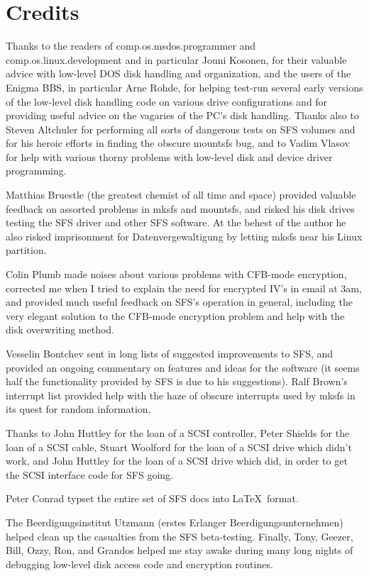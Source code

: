 \section{Credits}

Thanks to the readers of comp.os.msdos.programmer and comp.os.linux.develop\-ment
and in particular Jouni Kosonen, for their valuable advice with low-level DOS
disk handling and organization, and the users of the Enigma BBS, in particular
Arne Rohde, for helping test-run several early versions of the low-level disk
handling code on various drive configurations and for providing useful advice
on the vagaries of the PC's disk handling.   Thanks also to Steven Altchuler
for performing all sorts of dangerous tests on SFS volumes and for his heroic
efforts in finding the obscure mountsfs bug, and to Vadim Vlasov for help with 
various thorny problems with low-level disk and device driver programming.

Matthias Bruestle (the greatest chemist of all time and space) provided
valuable feedback on assorted problems in mksfs and mountsfs, and risked his
disk drives testing the SFS driver and other SFS software.  At the behest of
the author he also risked imprisonment for Datenvergewaltigung by letting mksfs
near his Linux partition.

Colin Plumb made noises about various problems with CFB-mode encryption,
corrected me when I tried to explain the need for encrypted IV's in email at
3am, and provided much useful feedback on SFS's operation in general, including
the very elegant solution to the CFB-mode encryption problem and help with the
disk overwriting method.

Vesselin Bontchev sent in long lists of suggested improvements to SFS, and
provided an ongoing commentary on features and ideas for the software (it seems
half the functionality provided by SFS is due to his suggestions).  Ralf
Brown's interrupt list provided help with the haze of obscure interrupts used
by mksfs in its quest for random information.

Thanks to John Huttley for the loan of a SCSI controller, Peter Shields for the
loan of a SCSI cable, Stuart Woolford for the loan of a SCSI drive which didn't
work, and John Huttley for the loan of a SCSI drive which did, in order to get
the SCSI interface code for SFS going.

Peter Conrad typset the entire set of SFS docs into \LaTeX\ format.

The Beerdigungsinstitut Utzmann (erstes Erlanger Beerdigungsunternehmen) help\-ed
clean up the casualties from the SFS beta-testing.  Finally, Tony, Geezer,
Bill, Ozzy, Ron, and Grandos helped me stay awake during many long nights of
debugging low-level disk access code and encryption routines.

